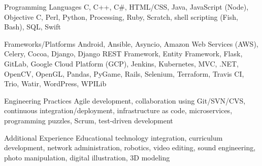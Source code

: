 


\begin{cvskills}


\cvskill
{Programming Languages} %
{C, C++, C\#, HTML/CSS, Java, JavaScript (Node), Objective C, Perl, Python, Processing, Ruby, Scratch, shell scripting (Fish, Bash), SQL, Swift} %


\cvskill
{Frameworks/Platforms} %
{Android, Ansible, Asyncio, Amazon Web Services (AWS), Celery, Cocoa, Django, Django REST Framework, Entity Framework, Flask, GitLab, Google Cloud Platform (GCP), Jenkins, Kubernetes, MVC, .NET, OpenCV, OpenGL, Pandas, PyGame, Rails, Selenium, Terraform, Travis CI, Trio, Watir, WordPress, WPILib} %


\cvskill
{Engineering Practices} %
{Agile development, collaboration using Git/SVN/CVS, continuous integration/deployment, infrastructure as code, microservices, programming puzzles, Scrum, test-driven development} %


\cvskill
{Additional Experience} %
{Educational technology integration, curriculum development, network administration, robotics, video editing, sound engineering, photo manipulation, digital illustration, 3D modeling
} %


\end{cvskills}